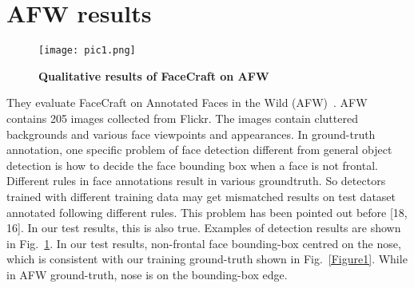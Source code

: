 \documentclass[10pt,twocolumn,letterpaper]{article}
\begin{document}
\section{AFW results}
\begin{figure}[!htb]
 \centering
 \texttt{[image: pic1.png]}\\
 \caption{ \textbf{Qualitative results of FaceCraft on AFW}}\label{Figure2}
 \end{figure}
They evaluate FaceCraft on Annotated Faces in the Wild (AFW)~\cite{name39}. AFW contains 205 images collected from Flickr. The images contain cluttered backgrounds and various face viewpoints and appearances. In ground-truth annotation, one specific problem of face detection different from general object detection is how to decide the face bounding box when a face is not frontal. Different rules in face annotations result in various groundtruth. So detectors trained with different training data may get mismatched results on test dataset annotated following different rules. This problem has been pointed out before [18, 16]. In our test results, this is also true. Examples of detection results are shown in Fig.~\ref{Figure2}. In our test results, non-frontal face bounding-box centred on the nose, which is consistent with our training ground-truth shown in Fig.~\ref{Figure1}. While in AFW ground-truth, nose is on the bounding-box edge.


\end{document}
